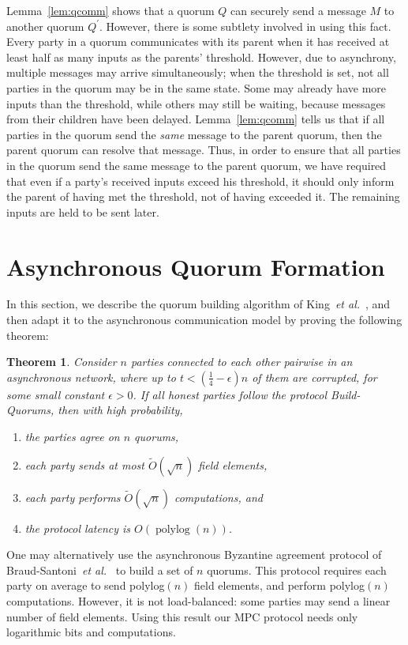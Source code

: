 \documentclass[11pt,letter]{article}
\newcommand{\etal}{\emph{et al.}}
\DeclareMathOperator{\polylog}{polylog}
\theoremstyle{mytheoremstyle}
\newtheorem{theorem}{Theorem}
\begin{document}
Lemma~\ref{lem:qcomm} shows that a quorum $Q$ can securely send a message $M$ to another quorum  $Q^\prime$. However, there is some subtlety involved in using this fact. Every party in a quorum communicates with its parent when it has received at least half as many inputs as the parents' threshold. However, due to asynchrony, multiple messages may arrive simultaneously; when the threshold is set, not all parties in the quorum may be in the same state. Some may already have more inputs than the threshold, while others may still be waiting, because messages from their children have been delayed. Lemma~\ref{lem:qcomm} tells us that if all parties in the quorum send the \emph{same} message to the parent quorum, then the parent quorum can resolve that message.
Thus, in order to ensure that all parties in the quorum send the same message to the parent quorum, we have required that even if a party's received inputs exceed his threshold, it should only inform the parent of having met the threshold, not of having exceeded it. The remaining inputs are held to be sent later.


\section{Asynchronous Quorum Formation} \label{sec:qf}
In this section, we describe the quorum building algorithm of King~\etal~\cite{King:2006:TSS:1170136.1170491,ICDCN11}, and then adapt it to the asynchronous communication model by proving the following theorem:

\begin{theorem}
	Consider $n$ parties connected to each other pairwise in an asynchronous network, where up to \mbox{$t<(\frac14-\epsilon)n$} of them are corrupted, for some small constant $\epsilon>0$. If all honest parties follow the protocol \textsf{Build-Quorums}, then with high probability,
	\begin{enumerate}
		\item the parties agree on $n$ quorums,
		\item each party sends at most $\tilde{O}(\sqrt n)$ field elements,
		\item each party performs $\tilde{O}(\sqrt n)$ computations, and
		\item the protocol latency is $O(\polylog(n))$.
	\end{enumerate}
	\label{thm:quorum-building}
\end{theorem}

One may alternatively use the asynchronous Byzantine agreement protocol of Braud-Santoni~\etal~\cite{Braud-Santoni:2013:FBA:2484239.2484243} to build a set of $n$ quorums. This protocol requires each party on average to send \textsf{polylog}$(n)$ field elements, and perform \textsf{polylog}$(n)$ computations.  However, it is not load-balanced: some parties may send a linear number of field elements. Using this result our MPC protocol needs only logarithmic bits and computations.
\end{document}
